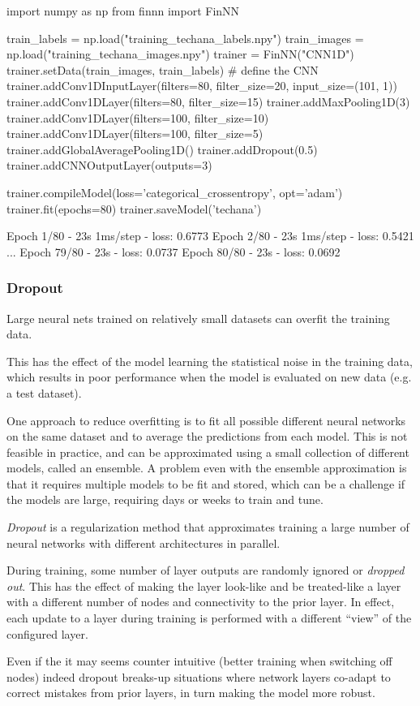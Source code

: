 \begin{ipython}
import numpy as np
from finnn import FinNN

train_labels = np.load("training_techana_labels.npy")
train_images = np.load("training_techana_images.npy")
trainer = FinNN("CNN1D")
trainer.setData(train_images, train_labels)
# define the CNN
trainer.addConv1DInputLayer(filters=80, filter_size=20,
input_size=(101, 1))
trainer.addConv1DLayer(filters=80, filter_size=15)
trainer.addMaxPooling1D(3)
trainer.addConv1DLayer(filters=100, filter_size=10)
trainer.addConv1DLayer(filters=100, filter_size=5)
trainer.addGlobalAveragePooling1D()
trainer.addDropout(0.5)
trainer.addCNNOutputLayer(outputs=3)

trainer.compileModel(loss='categorical_crossentropy', opt='adam')
trainer.fit(epochs=80)
trainer.saveModel('techana')
\end{ipython}
\begin{ioutput}
Epoch 1/80
- 23s 1ms/step - loss: 0.6773
Epoch 2/80
- 23s 1ms/step - loss: 0.5421
...
Epoch 79/80
- 23s - loss: 0.0737
Epoch 80/80
- 23s - loss: 0.0692
\end{ioutput}

\begin{attention}
\subsubsection{Dropout}

Large neural nets trained on relatively small datasets can overfit the
training data.

This has the effect of the model learning the statistical noise in the
training data, which results in poor performance when the model is
evaluated on new data (e.g. a test dataset).

One approach to reduce overfitting is to fit all possible different
neural networks on the same dataset and to average the predictions from
each model. This is not feasible in practice, and can be approximated
using a small collection of different models, called an ensemble. A
problem even with the ensemble approximation is that it requires
multiple models to be fit and stored, which can be a challenge if the
models are large, requiring days or weeks to train and tune.

\emph{Dropout} is a regularization method that approximates training a
large number of neural networks with different architectures in
parallel.

During training, some number of layer outputs are randomly ignored or
\emph{dropped out}. This has the effect of making the layer look-like
and be treated-like a layer with a different number of nodes and
connectivity to the prior layer. In effect, each update to a layer
during training is performed with a different ``view'' of the configured
layer.

Even if the it may seems counter intuitive (better training when
switching off nodes) indeed dropout breaks-up situations where network
layers co-adapt to correct mistakes from prior layers, in turn making
the model more robust.
\end{attention}

